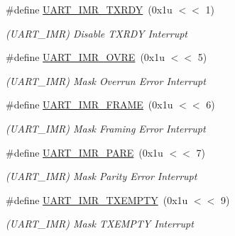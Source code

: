 \begin{DoxyCompactItemize}
\mbox{\label{group__SAME70__UART_gaa2e5fea302bac49877aec951e51e9b0c}} 
\#define \mbox{\hyperlink{group__SAME70__UART_gaa2e5fea302bac49877aec951e51e9b0c}{U\+A\+R\+T\+\_\+\+I\+M\+R\+\_\+\+T\+X\+R\+DY}}~(0x1u $<$$<$ 1)
\begin{DoxyCompactList}\small\item\em (U\+A\+R\+T\+\_\+\+I\+MR) Disable T\+X\+R\+DY Interrupt \end{DoxyCompactList}\item 
\mbox{\label{group__SAME70__UART_gaa82ecc6b26ab61b19a3429c3c6e5db9d}} 
\#define \mbox{\hyperlink{group__SAME70__UART_gaa82ecc6b26ab61b19a3429c3c6e5db9d}{U\+A\+R\+T\+\_\+\+I\+M\+R\+\_\+\+O\+V\+RE}}~(0x1u $<$$<$ 5)
\begin{DoxyCompactList}\small\item\em (U\+A\+R\+T\+\_\+\+I\+MR) Mask Overrun Error Interrupt \end{DoxyCompactList}\item 
\mbox{\label{group__SAME70__UART_ga8e344ba0f5ba7b6260231fd76e930139}} 
\#define \mbox{\hyperlink{group__SAME70__UART_ga8e344ba0f5ba7b6260231fd76e930139}{U\+A\+R\+T\+\_\+\+I\+M\+R\+\_\+\+F\+R\+A\+ME}}~(0x1u $<$$<$ 6)
\begin{DoxyCompactList}\small\item\em (U\+A\+R\+T\+\_\+\+I\+MR) Mask Framing Error Interrupt \end{DoxyCompactList}\item 
\mbox{\label{group__SAME70__UART_gaa0e99651b173e6d5068be7926e28f446}} 
\#define \mbox{\hyperlink{group__SAME70__UART_gaa0e99651b173e6d5068be7926e28f446}{U\+A\+R\+T\+\_\+\+I\+M\+R\+\_\+\+P\+A\+RE}}~(0x1u $<$$<$ 7)
\begin{DoxyCompactList}\small\item\em (U\+A\+R\+T\+\_\+\+I\+MR) Mask Parity Error Interrupt \end{DoxyCompactList}\item 
\mbox{\label{group__SAME70__UART_gab691d22dc36d8eb128e61dd8fbc10bd4}} 
\#define \mbox{\hyperlink{group__SAME70__UART_gab691d22dc36d8eb128e61dd8fbc10bd4}{U\+A\+R\+T\+\_\+\+I\+M\+R\+\_\+\+T\+X\+E\+M\+P\+TY}}~(0x1u $<$$<$ 9)
\begin{DoxyCompactList}\small\item\em (U\+A\+R\+T\+\_\+\+I\+MR) Mask T\+X\+E\+M\+P\+TY Interrupt \end{DoxyCompactList}\item 
$$
\end{DoxyCompactItemize}
